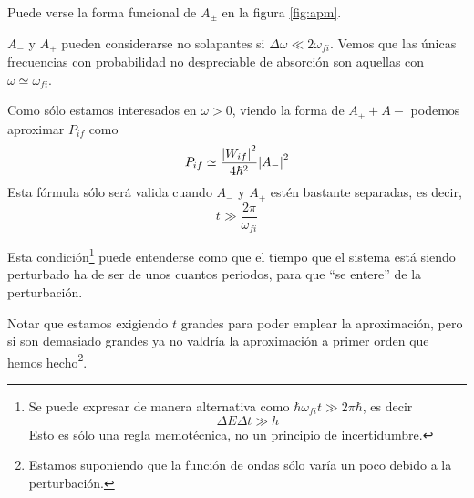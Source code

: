 Puede verse la forma funcional de $A_\pm$ en la figura \ref{fig:apm}.


\begin{marginfigure}
    \caption{$A_-$ y $A_+$ pueden considerarse no solapantes si
      $\Delta\omega \ll 2\omega_{fi}$. Vemos que las únicas
      frecuencias con probabilidad no despreciable de absorción son aquellas
      con $\omega\simeq\omega_{fi}$.
    }
    \label{fig:apm}
\end{marginfigure}

Como sólo estamos interesados en $\omega>0$, viendo la forma de
$A_++A-$ podemos aproximar $P_{if}$ como
\begin{equation}
  P_{if} \simeq \frac{\abs{W_{if}}^2}{4 \hbar^2} \abs{A_-}^2
\end{equation}
Esta fórmula sólo será valida cuando $A_-$ y $A_+$ estén bastante
separadas, es decir,
\begin{equation}
  t \gg \frac{2\pi}{\omega_{fi}}
\end{equation}

Esta condición\footnote{Se puede expresar de manera alternativa como
  $\hbar\omega_{fi}t\gg 2\pi \hbar$, es decir \[ \Delta E \Delta t \gg
    h \] Esto es sólo una regla memotécnica, no un principio de incertidumbre. } puede entenderse como que el tiempo que el sistema está
siendo perturbado ha de ser de unos cuantos periodos, para que ``se
entere'' de la perturbación.

Notar que estamos exigiendo $t$ grandes para poder emplear la
aproximación, pero si son demasiado grandes ya no valdría la
aproximación a primer orden que hemos hecho\footnote{Estamos
suponiendo que la función de ondas sólo varía un poco debido a la perturbación.}.

